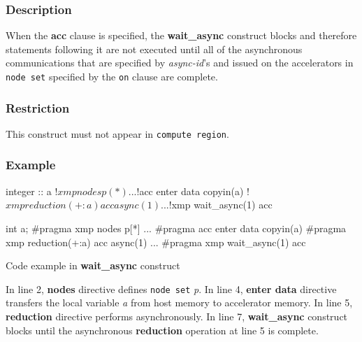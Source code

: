 \subsubsection*{Description}
When the {\bf acc} clause is specified,
the {\bf wait\_async} construct blocks and therefore
statements following it are not executed until all of the asynchronous
communications that are specified by {\it async-id}'s and issued on the accelerators in
{\tt node set} specified by the {\tt on} clause are complete.

\subsubsection*{Restriction}
This construct must not appear in {\OACC} {\tt compute region}.

\subsubsection*{Example}
\begin{myfigure}
\begin{minipage}{0.45\hsize}
\begin{center}
\begin{XACCFexampleL}
integer :: a
!$xmp nodes p(*)
...
!$acc enter data copyin(a)
!$xmp reduction(+:a) acc async(1)
...
!$xmp wait_async(1) acc
\end{XACCFexampleL}
\end{center}
\end{minipage}
%
\begin{minipage}{0.53\hsize}
\begin{center}
\begin{XACCCexampleR}
int a;
#pragma xmp nodes p[*]
...
#pragma acc enter data copyin(a)
#pragma xmp reduction(+:a) acc async(1)
...
#pragma xmp wait_async(1) acc
\end{XACCCexampleR}
\end{center}
\end{minipage}
\caption{Code example in {\XACC} {\bf wait\_async} construct}\label{code:waitasync}
\end{myfigure}

In line 2,
{\XMP} {\bf nodes} directive defines {\tt node set} {\it p}.
In line 4,
{\OACC} {\bf enter data} directive transfers the local variable {\it a} from host memory to accelerator memory.
In line 5,
{\XACC} {\bf reduction} directive performs asynchronously.
In line 7,
{\XACC} {\bf wait\_async} construct blocks until the asynchronous {\bf reduction} operation at line 5 is complete.

